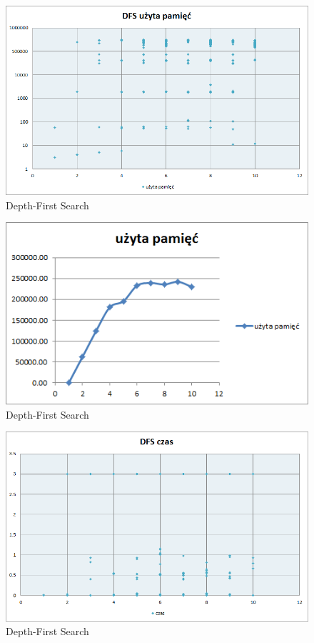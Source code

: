 \documentclass{classrep}
\begin{document}
\begin{figure}[ht]
\centering
			\includegraphics[scale=0.65]{pictures/DFS_pamiec_log.png}
	\caption{Depth-First Search}
	\label{fig:Depth-First Search}
\end{figure}

\begin{figure}[ht]
\centering
			\includegraphics[scale=0.65]{pictures/old/dfs_space.png}
	\caption{Depth-First Search}
	\label{fig:Depth-First Search}
\end{figure}

\begin{figure}[ht]
\centering
			\includegraphics[scale=0.65]{pictures/DFS_czas_exp.png}
	\caption{Depth-First Search}
	\label{fig:Depth-First Search}
\end{figure}
\end{document}
